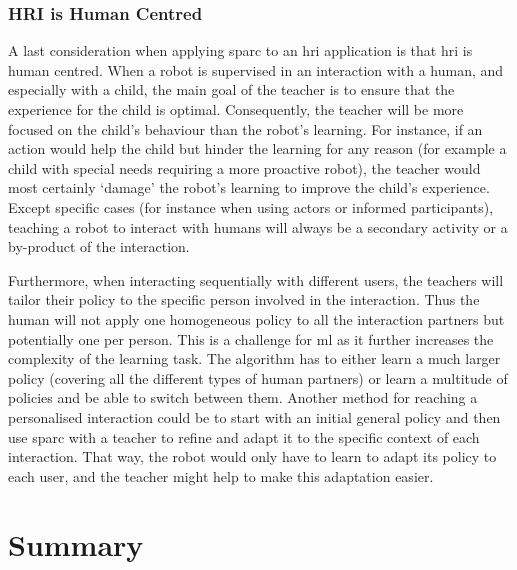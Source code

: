 \subsubsection{HRI is Human Centred}

A last consideration when applying \gls{sparc} to an \gls{hri} application is that \gls{hri} is human centred. When a robot is supervised in an interaction with a human, and especially with a child, the main goal of the teacher is to ensure that the experience for the child is optimal. Consequently, the teacher will be more focused on the child's behaviour than the robot's learning. For instance, if an action would help the child but hinder the learning for any reason (for example a child with special needs requiring a more proactive robot), the teacher would most certainly `damage' the robot's learning to improve the child's experience. Except specific cases (for instance when using actors or informed participants), teaching a robot to interact with humans will always be a secondary activity or a by-product of the interaction. 

Furthermore, when interacting sequentially with different users, the teachers will tailor their policy to the specific person involved in the interaction. Thus the human will not apply one homogeneous policy to all the interaction partners but potentially one per person. 
This is a challenge for \gls{ml} as it further increases the complexity of the learning task. The algorithm has to either learn a much larger policy (covering all the different types of human partners) or learn a multitude of policies and be able to switch between them. Another method for reaching a personalised interaction could be to start with an initial general policy and then use \gls{sparc} with a teacher to refine and adapt it to the specific context of each interaction. That way, the robot would only have to learn to adapt its policy to each user, and the teacher might help to make this adaptation easier.

\section{Summary}

